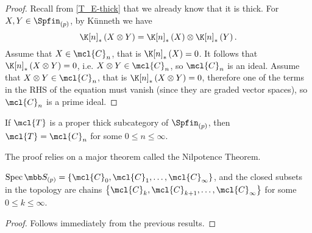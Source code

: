 \begin{proof}
	Recall from \ref{T_E-thick} that we already know that it is thick.
	For $X,Y \in \Spfin_{\left(p\right)}$, by K\"unneth we have 
	$$
	\K[n]_*\left(X \otimes  Y\right)
	= \K[n]_*\left(X\right) \otimes \K[n]_*\left(Y\right).
	$$
	Assume that $X \in \mcl{C}_n$, that is $\K[n]_*\left(X\right) = 0$.
	It follows that $\K[n]_*\left(X \otimes  Y\right) = 0$, i.e. $X \otimes Y \in \mcl{C}_n$, so $\mcl{C}_n$ is an ideal.
	Assume that $X \otimes Y\in \mcl{C}_n$, that is $\K[n]_*\left(X \otimes  Y\right) = 0$, therefore one of the terms in the RHS of the equation must vanish (since they are graded vector spaces), so $\mcl{C}_n$ is a prime ideal.
\end{proof}

\begin{theorem}\label{thick-subcategory-thm}
	If $\mcl{T}$ is a proper thick subcategory of $\Spfin_{\left(p\right)}$, then $\mcl{T} = \mcl{C}_n$ for some $0 \leq n \leq \infty$.
\end{theorem}

\begin{remark}
	The proof relies on a major theorem called the Nilpotence Theorem.
\end{remark}

\begin{corollary}
	$\spec \SS_{\left(p\right)} = \left\{ \mcl{C}_0, \mcl{C}_1, \dotsc, \mcl{C}_\infty \right\}$,
	and the closed subsets in the topology are chains
	$\left\{ \mcl{C}_k, \mcl{C}_{k+1}, \dotsc, \mcl{C}_\infty \right\}$
	for some $0 \leq k \leq \infty$.
\end{corollary}

\begin{proof}
	Follows immediately from the previous results.
\end{proof}

